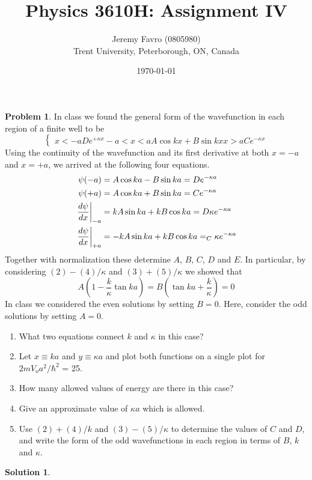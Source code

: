 \documentclass[10pt]{article}
\title{Physics 3610H: Assignment IV}
\author{Jeremy Favro (0805980) \\ Trent University, Peterborough, ON, Canada}
\date{\today}
\theoremstyle{definition}
\newtheorem{problem}{Problem}
\newtheorem{soln}{Solution}
\begin{document}
\maketitle

\begin{problem}
In class we found the general form of the wavefunction in each region of a finite well to
be
$$
  \begin{cases}
    x<-a De^{+\kappa x}
    -a<x<a A\cos kx + B \sin kx
    x> a Ce^{-\kappa x}
  \end{cases}
$$
Using the continuity of the wavefunction and its first derivative at both $x = -a$ and $x = +a$,
we arrived at the following four equations.
\begin{align}
  \psi(-a)                     & =A\cos ka - B \sin ka  = De^{-\kappa a}          \\
  \psi(+a)                     & =A\cos ka + B \sin ka  = Ce^{-\kappa a}          \\
  \eval{\frac{d\psi}{dx}}_{-a} & = kA\sin ka +kB\cos ka = D\kappa e^{-\kappa a}   \\
  \eval{\frac{d\psi}{dx}}_{+a} & = -kA\sin ka +kB\cos ka = _C\kappa e^{-\kappa a}
\end{align}
Together with normalization these determine $A$, $B$, $C$, $D$ and $E$. In particular, by considering
$(2)-(4)/\kappa$ and $(3)+(5)/\kappa$ we showed that
$$
  A\left(1-\frac{k}{\kappa}\tan ka\right) = B\left(\tan ka + \frac{k}{\kappa}\right)=0
$$
In class we considered the even solutions by setting $B = 0$. Here, consider the odd solutions
by setting $A = 0$.
\begin{enumerate}[label=(\alph*)]
  \item What two equations connect $k$ and $\kappa$ in this case?
  \item Let $x \equiv  ka$ and $y \equiv \kappa a$ and plot both functions on a single plot for $2mV_oa^2/\hbar^2$ = 25.
  \item How many allowed values of energy are there in this case?
  \item Give an approximate value of $\kappa a$ which is allowed.
  \item Use $(2)+(4)/k$ and $(3)-(5)/\kappa$ to determine the values of $C$ and $D$, and write the form of
the odd wavefunctions in each region in terms of $B$, $k$ and $\kappa$.
\end{enumerate}
\end{problem}
\begin{soln}
  
\end{soln}
\end{document}
